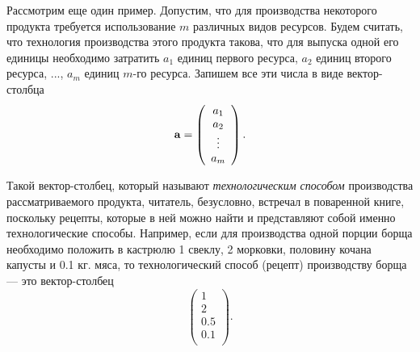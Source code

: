      Рассмотрим еще один пример. Допустим, что для
     производства некоторого продукта требуется использование
     $m$ различных видов ресурсов. Будем считать, что технология
     производства этого продукта такова, что для выпуска
     одной его единицы необходимо затратить $a_{1}$ единиц первого
     ресурса, $a_{2}$ единиц второго ресурса, ..., $a_{m}$ единиц $m$-го
     ресурса. Запишем все эти числа в виде вектор-столбца
    \[\mathbf{a}=\left(
     \begin{array}{c}
        a_{1} \\
        a_{2} \\
        \vdots \\
        a_{m}  \\
      \end{array}
    \right).\]




     Такой вектор-столбец, который называют \emph{технологическим
     способом} производства рассматриваемого продукта, читатель,
     безусловно, встречал в поваренной
     книге, поскольку рецепты, которые в ней можно найти и
     представляют собой именно технологические способы. Например,
     если для производства одной порции борща необходимо положить в
     кастрюлю 1 свеклу, 2 морковки, половину кочана капусты и 0.1 кг.
     мяса, то технологический способ (рецепт) производству борща --- это
     вектор-столбец
     \[\left(
     \begin{array}{c}
        1 \\
        2 \\
        0.5 \\
        0.1  \\
      \end{array}
    \right).\]

